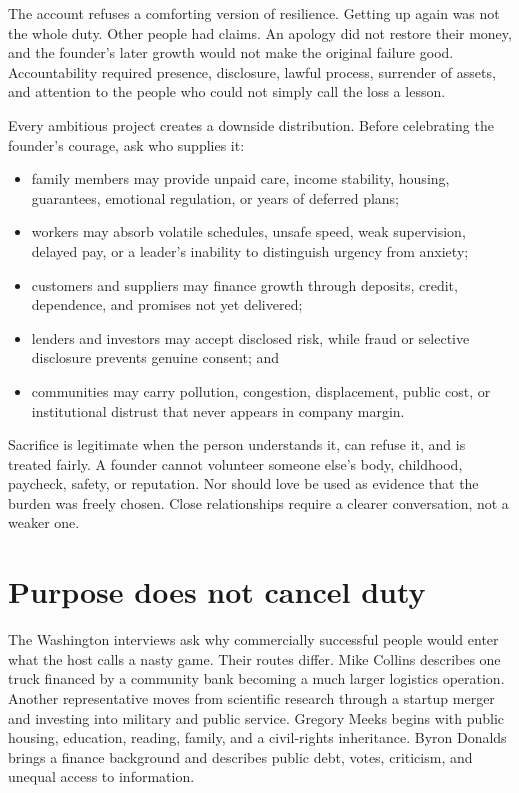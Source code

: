 The account refuses a comforting version of resilience. Getting up again was
not the whole duty. Other people had claims. An apology did not restore their
money, and the founder's later growth would not make the original failure good.
Accountability required presence, disclosure, lawful process, surrender of
assets, and attention to the people who could not simply call the loss a
lesson.

Every ambitious project creates a downside distribution. Before celebrating
the founder's courage, ask who supplies it:

\begin{itemize}[itemsep=0.13em]
\item family members may provide unpaid care, income stability, housing,
  guarantees, emotional regulation, or years of deferred plans;
\item workers may absorb volatile schedules, unsafe speed, weak supervision,
  delayed pay, or a leader's inability to distinguish urgency from anxiety;
\item customers and suppliers may finance growth through deposits, credit,
  dependence, and promises not yet delivered;
\item lenders and investors may accept disclosed risk, while fraud or selective
  disclosure prevents genuine consent; and
\item communities may carry pollution, congestion, displacement, public cost,
  or institutional distrust that never appears in company margin.
\end{itemize}

Sacrifice is legitimate when the person understands it, can refuse it, and is
treated fairly. A founder cannot volunteer someone else's body, childhood,
paycheck, safety, or reputation. Nor should love be used as evidence that the
burden was freely chosen. Close relationships require a clearer conversation,
not a weaker one.

\section{Purpose does not cancel duty}

The Washington interviews ask why commercially successful people would enter
what the host calls a nasty game. Their routes differ. Mike Collins describes
one truck financed by a community bank becoming a much larger logistics
operation. Another representative moves from scientific research through a
startup merger and investing into military and public service. Gregory Meeks
begins with public housing, education, reading, family, and a civil-rights
inheritance. Byron Donalds brings a finance background and describes public
debt, votes, criticism, and unequal access to information.

